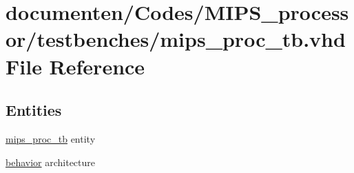 \hypertarget{mips__proc__tb_8vhd}{\section{documenten/\-Codes/\-M\-I\-P\-S\-\_\-processor/testbenches/mips\-\_\-proc\-\_\-tb.vhd File Reference}
\label{mips__proc__tb_8vhd}
}
\subsection*{Entities}
\begin{DoxyCompactItemize}
\item 
\hyperlink{classmips__proc__tb}{mips\-\_\-proc\-\_\-tb} entity
\item 
\hyperlink{classmips__proc__tb_1_1behavior}{behavior} architecture
\end{DoxyCompactItemize}
